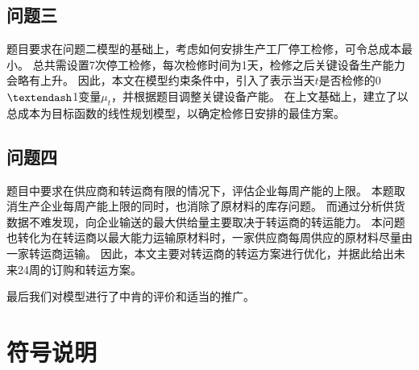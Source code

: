 \subsection{问题三}

题目要求在问题二模型的基础上，考虑如何安排生产工厂停工检修，可令总成本最小。
总共需设置7次停工检修，每次检修时间为1天，检修之后关键设备生产能力会略有上升。
因此，本文在模型约束条件中，引入了表示当天$t$是否检修的0$\textendash$1变量$\mu_t$，并根据题目调整关键设备产能。
在上文基础上，建立了以总成本为目标函数的线性规划模型，以确定检修日安排的最佳方案。



\subsection{问题四}
题目中要求在供应商和转运商有限的情况下，评估企业每周产能的上限。
本题取消生产企业每周产能上限的同时，也消除了原材料的库存问题。
而通过分析供货数据不难发现，向企业输送的最大供给量主要取决于转运商的转运能力。
本问题也转化为在转运商以最大能力运输原材料时，一家供应商每周供应的原材料尽量由一家转运商运输。
因此，本文主要对转运商的转运方案进行优化，并据此给出未来24周的订购和转运方案。

最后我们对模型进行了中肯的评价和适当的推广。

\section{符号说明} %
\label{sec:符号说明}

\begin{table}[!htbp]
\centering
\caption[文中符号所用说明]{文中符号所用说明}
\end{table}

